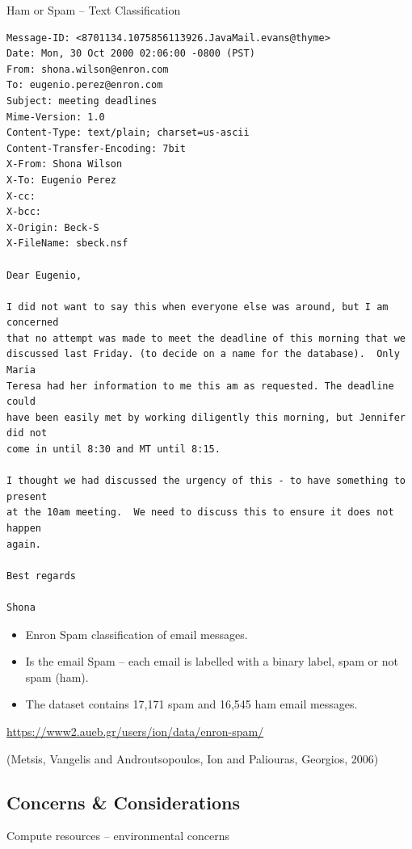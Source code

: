 \documentclass[10pt]{beamer}
\begin{document}
\begin{frame}[fragile,allowframebreaks,label=]{Ham or Spam -- Text Classification}
 \begin{verbatim}
Message-ID: <8701134.1075856113926.JavaMail.evans@thyme>
Date: Mon, 30 Oct 2000 02:06:00 -0800 (PST)
From: shona.wilson@enron.com
To: eugenio.perez@enron.com
Subject: meeting deadlines
Mime-Version: 1.0
Content-Type: text/plain; charset=us-ascii
Content-Transfer-Encoding: 7bit
X-From: Shona Wilson
X-To: Eugenio Perez
X-cc: 
X-bcc: 
X-Origin: Beck-S
X-FileName: sbeck.nsf

Dear Eugenio,

I did not want to say this when everyone else was around, but I am concerned 
that no attempt was made to meet the deadline of this morning that we 
discussed last Friday. (to decide on a name for the database).  Only Maria 
Teresa had her information to me this am as requested. The deadline could 
have been easily met by working diligently this morning, but Jennifer did not 
come in until 8:30 and MT until 8:15.

I thought we had discussed the urgency of this - to have something to present 
at the 10am meeting.  We need to discuss this to ensure it does not happen 
again.

Best regards

Shona
\end{verbatim}

\begin{itemize}
\item Enron Spam classification of email messages.
\item Is the email Spam -- each email is labelled with a binary label, spam or not spam
(ham).
\item The dataset contains 17,171 spam and 16,545 ham email messages.
\end{itemize}

\url{https://www2.aueb.gr/users/ion/data/enron-spam/}

(Metsis, Vangelis and Androutsopoulos, Ion and Paliouras, Georgios, 2006)
\end{frame}

\subsection*{Concerns \& Considerations}
\label{sec:org67f6ad4}

\begin{frame}[label={sec:org6200e7d}]{Compute resources -- environmental concerns}
\end{frame}
\end{document}

